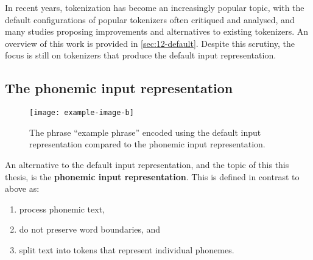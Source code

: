 In recent years, tokenization has become an increasingly popular topic, with the default configurations of popular tokenizers often critiqued and analysed, and many studies proposing improvements and alternatives to existing tokenizers. An overview of this work is provided in \cref{sec:12-default}. Despite this scrutiny, the focus is still on tokenizers that produce the default input representation. 

\subsection{The phonemic input representation}\label{sec:12-phonemic}




\begin{figure}[t]
    \centering
    \texttt{[image: example-image-b]}
    \caption{The phrase ``example phrase'' encoded using the default input representation compared to the phonemic input representation.}
    \label{fig:12-representation}
\end{figure}

An alternative to the default input representation, and the topic of this this thesis, is the \textbf{phonemic input representation}. This is defined in contrast to above as:

\begin{enumerate}
    \item process phonemic text,
    \item do not preserve word boundaries, and
    \item split text into tokens that represent individual phonemes.
\end{enumerate}

